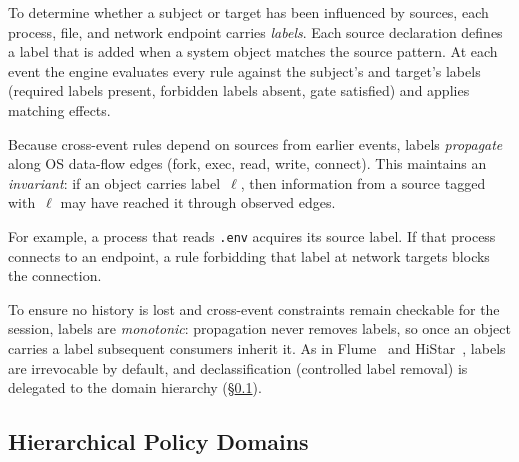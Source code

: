 To determine whether a subject or target has been influenced by sources, each process, file, and network endpoint carries \emph{labels}.
Each source declaration defines a label that is added when a system object matches the source pattern.
At each event the engine evaluates every rule against the subject's and target's labels (required labels present, forbidden labels absent, gate satisfied) and applies matching effects.

Because cross-event rules depend on sources from earlier events, labels \emph{propagate} along OS data-flow edges (fork, exec, read, write, connect).
This maintains an \emph{invariant}: if an object carries label~$\ell$, then information from a source tagged with~$\ell$ may have reached it through observed edges.

For example, a process that reads \texttt{.env} acquires its source label.
If that process connects to an endpoint, a rule forbidding that label at network targets blocks the connection.

To ensure no history is lost and cross-event constraints remain checkable for the session, labels are \emph{monotonic}: propagation never removes labels, so once an object carries a label subsequent consumers inherit it.
As in Flume~\cite{flume} and HiStar~\cite{zeldovich2006histar}, labels are irrevocable by default, and declassification (controlled label removal) is delegated to the domain hierarchy (\S\ref{sec:authority}).

\subsection{Hierarchical Policy Domains}
\label{sec:authority}

